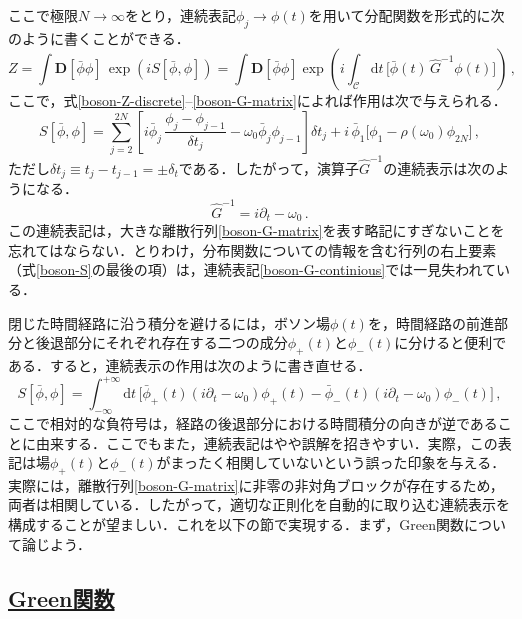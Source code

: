 \documentclass[a4paper,11pt]{ltjsarticle}
\newcommand{\subsectionlink}[1]{\subsection[#1]{\hyperlink{toc}{#1}}}
\def\d{\mathrm{d}}
\def\D{\mathbf{D}}
\begin{document}
ここで極限$N\to \infty$をとり，連続表記$\phi_j\to \phi(t)$を用いて分配関数を形式的に次のように書くことができる．
\begin{equation}\label{boson-Z-1}
Z=\int\D[\bar{\phi}\phi]\,
\exp\left(iS[\bar{\phi},\phi]\right)=\int\D[\bar{\phi}\phi]
\exp\left(i\int_{\mathcal{C}}\d t \,
\big[\bar{\phi}(t)\,\hat{G}^{-1}\phi(t)\big] \right)\,,
\end{equation}ここで，式\eqref{boson-Z-discrete}--\eqref{boson-G-matrix}によれば作用は次で与えられる．
\begin{equation}\label{boson-S}
S[\bar{\phi},\phi] =
\sum\limits_{j=2}^{2N}\left[i\bar\phi_j\,\frac{\phi_j-\phi_{j-1}}{\delta
t_j} -\omega_0\bar\phi_j\phi_{j-1}\right]\delta
t_j+i\,\bar\phi_1\Big[\phi_1-\rho(\omega_0)\phi_{2N}\Big] \, ,
\end{equation}ただし$\delta t_j\equiv t_j-t_{j-1}=\pm \delta_t$である．したがって，演算子$\hat G^{-1}$の連続表示は次のようになる．
\begin{equation}\label{boson-G-continious}
\hat G^{-1}= i\partial_t - \omega_0 \,.
\end{equation}この連続表記は，大きな離散行列\eqref{boson-G-matrix}を表す略記にすぎないことを忘れてはならない．とりわけ，分布関数についての情報を含む行列の右上要素（式\eqref{boson-S}の最後の項）は，連続表記\eqref{boson-G-continious}では一見失われている．


閉じた時間経路に沿う積分を避けるには，ボソン場$\phi(t)$を，時間経路の前進部分と後退部分にそれぞれ存在する二つの成分$\phi_{+}(t)$と$\phi_{-}(t)$に分けると便利である．すると，連続表示の作用は次のように書き直せる．
\begin{equation} \label{boson-S-plus-minus}
S[\bar{\phi},\phi]=\int_{-\infty}^{+\infty} \d t\,
\big[\bar\phi_{+}(t)(i\partial_t - \omega_0) \phi_{+}(t)-
\bar\phi_{-}(t)(i\partial_t - \omega_0) \phi_{-}(t)\big]\, ,
\end{equation}ここで相対的な負符号は，経路の後退部分における時間積分の向きが逆であることに由来する．ここでもまた，連続表記はやや誤解を招きやすい．実際，この表記は場$\phi_{+}(t)$と$\phi_{-}(t)$がまったく相関していないという誤った印象を与える．実際には，離散行列\eqref{boson-G-matrix}に非零の非対角ブロックが存在するため，両者は相関している．したがって，適切な正則化を自動的に取り込む連続表示を構成することが望ましい．これを以下の節で実現する．まず，Green関数について論じよう．


\subsectionlink{Green関数}\label{sec_bosons-2}
\end{document}
